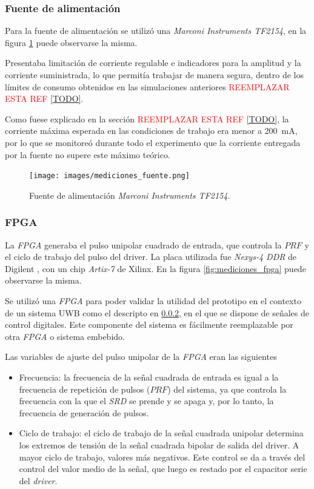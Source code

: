 \subsubsection{Fuente de alimentación}

Para la fuente de alimentación se utilizó una \textit{Marconi Instruments
TF2154}, en la figura \ref{fig:mediciones_fuente} puede observarse la misma.

Presentaba limitación de corriente regulable e indicadores para la amplitud y la
corriente suministrada, lo que permitía trabajar de manera segura, dentro de los
límites de consumo obtenidos en las simulaciones anteriores
\textcolor{red}{REEMPLAZAR ESTA REF \ref{TODO}}.

Como fuese explicado en la sección \textcolor{red}{REEMPLAZAR ESTA REF
\ref{TODO}},
la corriente máxima esperada en las condiciones de trabajo era menor a \qty{200}{\milli\ampere},
por lo que se monitoreó durante todo el experimento que la corriente entregada por la fuente
no supere este máximo teórico.

\begin{figure}
  \centering
    \texttt{[image: images/mediciones\_fuente.png]}
    \caption{Fuente de alimentación \textit{Marconi Instruments TF2154}.}
    \label{fig:mediciones_fuente}
\end{figure}


\subsubsection{FPGA}

La \textit{FPGA} generaba el pulso unipolar cuadrado de entrada, que controla la
$PRF$ y el ciclo de trabajo del pulso del driver. La placa utilizada fue
\textit{Nexys-4 DDR} de Digilent \cite{digilent_nexys4ddr}, con un chip
\textit{Artix-7} de Xilinx. En la figura \ref{fig:mediciones_fpga} puede
observarse la misma. 

Se utilizó una \textit{FPGA} para poder validar la utilidad del prototipo en el
contexto de un sistema UWB como el descripto en \ref{}, en el que se dispone de
señales de control digitales. Este componente del sistema es fácilmente
reemplazable por otra \textit{FPGA} o sistema embebido.

Las variables de ajuste del pulso unipolar de la \textit{FPGA} eran las siguientes

\begin{itemize}
  \item Frecuencia: la frecuencia de la señal cuadrada de entrada es igual a la
    frecuencia de repetición de pulsos ($PRF$) del sistema, ya que controla la
    frecuencia con la que el \textit{SRD} se prende y se apaga y, por lo tanto,
    la frecuencia de generación de pulsos.
  \item Ciclo de trabajo: el ciclo de trabajo de la señal cuadrada unipolar
    determina los extremos de tensión de la señal cuadrada bipolar de salida del
    driver. A mayor ciclo de trabajo, valores más negativos. Este control se da
    a través del control del valor medio de la señal, que luego es restado por
    el capacitor serie del \textit{driver}.
\end{itemize}

